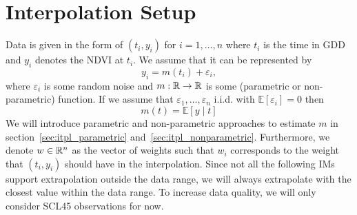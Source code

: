 \section{Interpolation Setup}{\label{sec:itpl_setup}
	Data is given in the form of $\left(t_{i}, y_{i}\right)$ for $i=1, \ldots, n$ where $t_i$ is the time in GDD and $y_i$ denotes the NDVI at $t_i$. We assume that it can be represented by
	$$
		y_{i}=m\left(t_{i}\right)+\varepsilon_{i},
	$$
	where $\varepsilon_i$ is some random noise and $m: \mathbb{R} \rightarrow \mathbb{R}$ is some (parametric or non-parametric) function. If we assume that $\varepsilon_{1}, \ldots, \varepsilon_{n}$ i.i.d. with $\mathbb{E}\left[\varepsilon_{i}\right]=0$ then 
	$$
		m(t)=\mathbb{E}[y \mid t]
	$$
	We will introduce parametric and non-parametric approaches to estimate $m$ in section~\ref{sec:itpl_parametric} and~\ref{sec:itpl_nonparametric}.
	Furthermore, we denote $w\in \mathbb{R}^n$ as the vector of weights such that $w_i$ corresponds to the weight that $(t_i, y_i)$ should have in the interpolation. Since not all the following IMs support extrapolation outside the data range, we will always extrapolate with the closest value within the data range. 
	To increase data quality, we will only consider SCL45 observations for now. 
}







